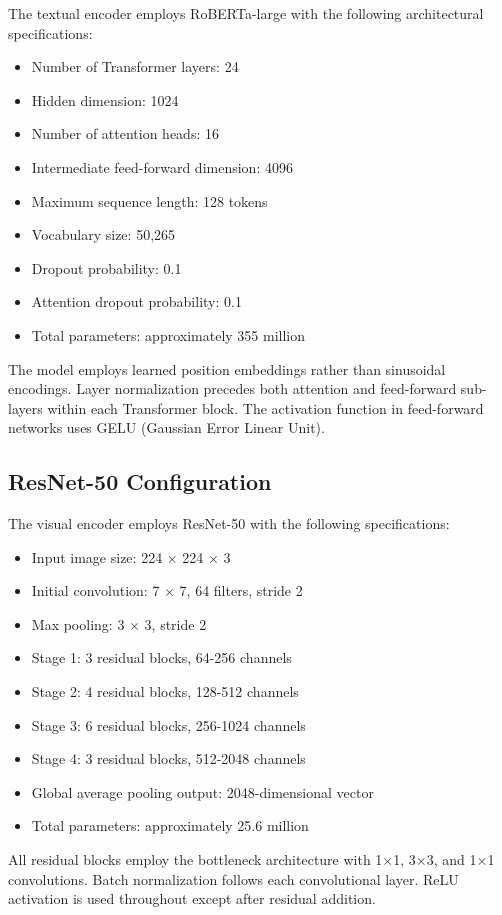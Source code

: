 \documentclass[12pt,a4paper]{report}
\begin{document}
The textual encoder employs RoBERTa-large with the following architectural specifications:
\begin{itemize}
\item Number of Transformer layers: 24
\item Hidden dimension: 1024
\item Number of attention heads: 16
\item Intermediate feed-forward dimension: 4096
\item Maximum sequence length: 128 tokens
\item Vocabulary size: 50,265
\item Dropout probability: 0.1
\item Attention dropout probability: 0.1
\item Total parameters: approximately 355 million
\end{itemize}

The model employs learned position embeddings rather than sinusoidal encodings. Layer normalization precedes both attention and feed-forward sub-layers within each Transformer block. The activation function in feed-forward networks uses GELU (Gaussian Error Linear Unit).

\subsection{ResNet-50 Configuration}

The visual encoder employs ResNet-50 with the following specifications:
\begin{itemize}
\item Input image size: 224 × 224 × 3
\item Initial convolution: 7 × 7, 64 filters, stride 2
\item Max pooling: 3 × 3, stride 2
\item Stage 1: 3 residual blocks, 64-256 channels
\item Stage 2: 4 residual blocks, 128-512 channels
\item Stage 3: 6 residual blocks, 256-1024 channels
\item Stage 4: 3 residual blocks, 512-2048 channels
\item Global average pooling output: 2048-dimensional vector
\item Total parameters: approximately 25.6 million
\end{itemize}

All residual blocks employ the bottleneck architecture with 1×1, 3×3, and 1×1 convolutions. Batch normalization follows each convolutional layer. ReLU activation is used throughout except after residual addition.
\end{document}
